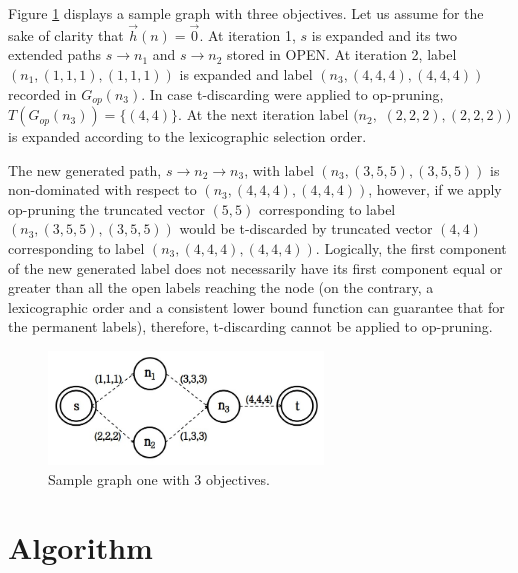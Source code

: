 \begin{ejemplo}\label{chapMultiObjAlg:ej:op-pruning}
Figure \ref{fig:2-4} displays a sample graph with three objectives. Let us assume for the sake of clarity that $\vec h(n) = \vec 0$. At iteration 1, $s$ is expanded and its two extended paths $s \rightarrow n_1$ and $s \rightarrow n_2$ stored in OPEN. At iteration 2, label $(n_1, (1,1,1), (1,1,1))$ is expanded and label $(n_3, (4,4,4), (4,4,4))$ recorded in $G_{op}(n_3)$. In case t-discarding were applied to op-pruning, $T(G_{op}(n_3)) = \{ (4,4) \}$. At the next iteration label $(n_2,$ $(2,2,2), (2,2,2))$ is expanded according to the lexicographic selection order. 

The new generated path, $s \rightarrow n_2 \rightarrow n_3$, with label $(n_3, (3,5,5), (3,5,5))$ is non-dominated with respect to $(n_3, (4,4,4), (4,4,4))$, however, if we apply op-pruning the truncated vector $(5,5)$ corresponding to label $(n_3, (3,5,5), (3,5,5))$ would be t-discarded by truncated vector $(4,4)$ corresponding to label $(n_3, (4,4,4), (4,4,4))$. Logically, the first component of the new generated label does not necessarily have its first component equal or greater than all the open labels reaching the node (on the contrary, a lexicographic order and a consistent lower bound function can guarantee that for the permanent labels), therefore, t-discarding cannot be applied to op-pruning.
\end{ejemplo}

\begin{figure}%
\centering
\includegraphics[width=0.65\textwidth]{Images/Chapter4/example-op-pruning}
\caption{Sample graph one with 3 objectives.}
\label{fig:2-4}
\end{figure}

\section{Algorithm \texorpdfstring{\lexgote}{LEXGO*te}}
\label{chapMultiObjAlg:subsec:lexgote}

